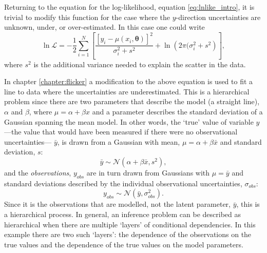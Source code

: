 Returning to the equation for the log-likelihood, equation
\ref{eq:lnlike_intro}, it is trivial to modify this function for the case
where the $y$-direction uncertainties are unknown, under, or over-estimated.
In this case one could write
\begin{equation}
    \ln\mathcal{L} =
    -\frac{1}{2} \sum_{i=1}^N \left[\frac{[y_i - \mu(x_i,
    \mathbf{\theta})]^2}{\sigma_i^2 + s^2} +
    \ln\left(2\pi(\sigma_i^2 + s^2\right) \right],
\end{equation}
where $s^2$ is the additional variance needed to explain the scatter in the
data.

In chapter \ref{chapter:flicker} a modification to the above equation is used
to fit a line to data where the uncertainties are underestimated.
This is a hierarchical problem since there are two parameters that describe
the model (a straight line), $\alpha$ and $\beta$, where $\mu = \alpha +
\beta x$ and a parameter describes the standard deviation of a Gaussian
spanning the mean model.
In other words, the `true' value of variable $y$---the value that would have
been measured if there were no observational uncertainties---
$\bar{y}$, is drawn from a Gaussian with mean, $\mu = \alpha + \beta \bar{x}$
and standard deviation, $s$:
\begin{equation}
\bar{y} \sim \mathcal{N}(\alpha + \beta\bar{x}, s^2),
\end{equation}
and the {\it observations}, $y_{obs}$ are in turn drawn from Gaussians with
$\mu = \bar{y}$ and standard deviations described by the individual
observational uncertainties, $\sigma_{obs}$:
\begin{equation}
y_{obs} \sim \mathcal{N}(\bar{y}, \sigma_{obs}^2).
\end{equation}
Since it is the observations that are modelled, not the latent parameter,
$\bar{y}$, this is a hierarchical process.
In general, an inference problem can be described as hierarchical when there
are multiple `layers' of conditional dependencies.
In this example there are two such `layers': the dependence of the
observations on the true values and the dependence of the true values on the
model parameters.

